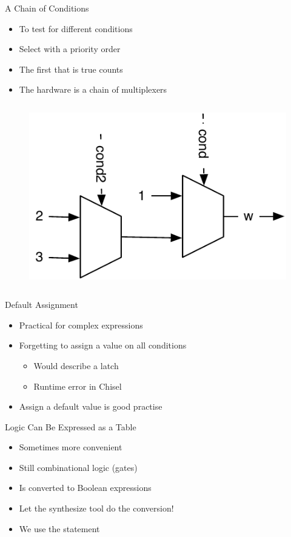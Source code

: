 \begin{frame}[fragile]{A Chain of Conditions}
\begin{itemize}
\item To test for different conditions
\item Select with a priority order
\item The first that is true counts
\item The hardware is a chain of multiplexers
\end{itemize}
\begin{columns}
\begin{figure}
  \includegraphics[scale=\scale]{../figures/mux-chain}
\end{figure}
\end{columns}
\end{frame}

\begin{frame}[fragile]{Default Assignment}
\begin{itemize}
\item Practical for complex expressions
\item Forgetting to assign a value on all conditions
\begin{itemize}
\item Would describe a latch
\item Runtime error in Chisel
\end{itemize}
\item Assign a default value is good practise
\end{itemize}
\end{frame}

\begin{frame}[fragile]{Logic Can Be Expressed as a Table}
\begin{itemize}
\item Sometimes more convenient 
\item Still combinational logic (gates)
\item Is converted to Boolean expressions
\item Let the synthesize tool do the conversion!
\item We use the  statement
\end{itemize}
\end{frame}


